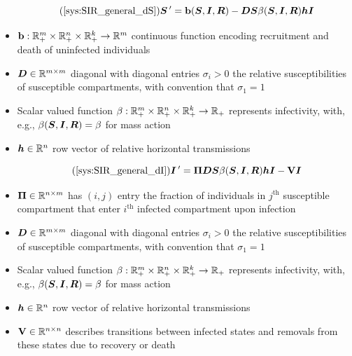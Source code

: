 \documentclass[aspectratio=169]{beamer}\usepackage[]{graphicx}\usepackage[]{xcolor}
\begin{document}
\begin{frame}
\begin{equation}\tag{\ref{sys:SIR_general_dS}}
\bS\pprime = \mathbf{b}(\bS,\bI,\bR)-\bD\bS\beta(\bS,\bI,\bR)\bh\bI
\end{equation}
\begin{itemize}
\item $\mathbf{b}:\mathbb{R}_+^m\times\mathbb{R}_+^n\times\mathbb{R}_+^k\to\mathbb{R}^m$ continuous function encoding recruitment and death of uninfected individuals
\item $\bm{D}\in\mathbb{R}^{m\times m}$ diagonal with diagonal entries $\sigma_i>0$ the relative susceptibilities of susceptible compartments, with convention that $\sigma_1=1$
\item Scalar valued function $\beta:\mathbb{R}_+^m\times\mathbb{R}_+^n\times\mathbb{R}_+^k\to\mathbb{R}_+$ represents infectivity, with, e.g., $\beta(\bm{S},\bm{I},\bm{R})=\beta$ for mass action
\item $\bm{h}\in\mathbb{R}^{n}$ row vector of relative horizontal transmissions
\end{itemize}
\end{frame}  


\begin{frame}
\begin{equation}\tag{\ref{sys:SIR_general_dI}}
\bI\pprime = \bPi\bD\bS\beta(\bS,\bI,\bR)\bh\bI-\mathbf{V}\bI
\end{equation}
\begin{itemize}
\item $\bm{\Pi}\in\mathbb{R}^{n\times m}$ has $(i,j)$ entry the fraction of individuals in $j^{\textrm{th}}$ susceptible compartment that enter $i^{\textrm{th}}$ infected compartment upon infection
\item $\bm{D}\in\mathbb{R}^{m\times m}$ diagonal with diagonal entries $\sigma_i>0$ the relative susceptibilities of susceptible compartments, with convention that $\sigma_1=1$
\item Scalar valued function $\beta:\mathbb{R}_+^m\times\mathbb{R}_+^n\times\mathbb{R}_+^k\to\mathbb{R}_+$ represents infectivity, with, e.g., $\beta(\bm{S},\bm{I},\bm{R})=\beta$ for mass action
\item $\bm{h}\in\mathbb{R}^{n}$ row vector of relative horizontal transmissions
\item $\mathbf{V}\in\mathbb{R}^{n\times n}$ describes transitions between infected states and removals from these states due to recovery or death
\end{itemize}
\end{frame}  
\end{document}
